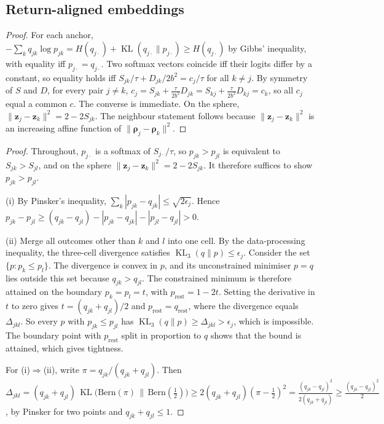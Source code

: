 \documentclass{article}
\theoremstyle{plain}
\theoremstyle{definition}
\theoremstyle{remark}
\newcommand{\z}{\bm{z}}
\DeclareMathOperator{\KL}{KL}
\begin{document}
\subsection{Return-aligned embeddings}
\thmracl*
\begin{proof}
For each anchor, $-\sum_kq_{jk}\log p_{jk}=H(q_{j\cdot})+\KL(q_{j\cdot}\|p_{j\cdot})\ge H(q_{j\cdot})$ by Gibbs' inequality, with equality iff $p_{j\cdot}=q_{j\cdot}$. Two softmax vectors coincide iff their logits differ by a constant, so equality holds iff $S_{jk}/\tau+D_{jk}/2b^2=c_j/\tau$ for all $k\neq j$. By symmetry of $S$ and $D$, for every pair $j\neq k$, $c_j=S_{jk}+\tfrac{\tau}{2b^2}D_{jk}=S_{kj}+\tfrac{\tau}{2b^2}D_{kj}=c_k$, so all $c_j$ equal a common $c$. The converse is immediate. On the sphere, $\|\z_j-\z_k\|^2=2-2S_{jk}$.
The neighbour statement follows because $\|\z_j-\z_k\|^2$ is an increasing affine function of $\|\bm\rho_j-\bm\rho_k\|^2$.
\end{proof}

\thmrobustnn*
\begin{proof}
Throughout, $p_{j\cdot}$ is a softmax of $S_{j\cdot}/\tau$, so $p_{jk}>p_{jl}$ is equivalent to $S_{jk}>S_{jl}$, and on the sphere $\|\z_j-\z_k\|^2=2-2S_{jk}$. It therefore suffices to show $p_{jk}>p_{jl}$.

(i) By Pinsker's inequality, $\sum_{k}|p_{jk}-q_{jk}|\le\sqrt{2\epsilon_j}$. Hence $p_{jk}-p_{jl}\ge(q_{jk}-q_{jl})-|p_{jk}-q_{jk}|-|p_{jl}-q_{jl}|>0$.

(ii) Merge all outcomes other than $k$ and $l$ into one cell. By the data-processing inequality, the three-cell divergence satisfies $\KL_3(q\|p)\le\epsilon_j$. Consider the set $\{p: p_k\le p_l\}$. The divergence is convex in $p$, and its unconstrained minimiser $p=q$ lies outside this set because $q_{jk}>q_{jl}$. The constrained minimum is therefore attained on the boundary $p_k=p_l=t$, with $p_{\text{rest}}=1-2t$. Setting the derivative in $t$ to zero gives $t=(q_{jk}+q_{jl})/2$ and $p_{\text{rest}}=q_{\text{rest}}$, where the divergence equals $\Delta_{jkl}$. So every $p$ with $p_{jk}\le p_{jl}$ has $\KL_3(q\|p)\ge\Delta_{jkl}>\epsilon_j$, which is impossible. The boundary point with $p_{\text{rest}}$ split in proportion to $q$ shows that the bound is attained, which gives tightness.

For (i)$\Rightarrow$(ii), write $\pi=q_{jk}/(q_{jk}+q_{jl})$. Then $\Delta_{jkl}=(q_{jk}+q_{jl})\,\KL\big(\text{Bern}(\pi)\,\|\,\text{Bern}(\tfrac12)\big)\ge 2(q_{jk}+q_{jl})(\pi-\tfrac12)^2=\frac{(q_{jk}-q_{jl})^2}{2(q_{jk}+q_{jl})}\ge\frac{(q_{jk}-q_{jl})^2}{2}$, by Pinsker for two points and $q_{jk}+q_{jl}\le1$.
\end{proof}
\end{document}
